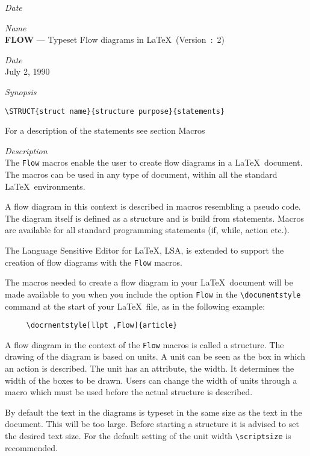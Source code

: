 \begin{namelist}{{\large\it Date}}

\item[{\large\it Name}]\mbox{}\\
    {\bf FLOW} --- Typeset Flow diagrams in \LaTeX\ (Version~:~2)

\item[{\large\it Date}]\mbox{}\\
     July 2, 1990

\item[{\large\it Synopsis}]\mbox{}
\begin{verbatim}
\STRUCT{struct name}{structure purpose}{statements}
\end{verbatim} For a description of the statements see section
Macros

\item[{\large\it Description}]\mbox{}\\
The {\tt Flow} macros
enable the user to create flow diagrams in a \LaTeX\  document.
The macros can be used in any type of document, within all the
standard \LaTeX\  environments.

A flow diagram in this context is
described in macros resembling a pseudo code. The diagram itself
is defined as a structure and is build from statements. Macros
are available for all standard programming statements (if, while,
action etc.).

The Language Sensitive Editor for \LaTeX, LSA, is extended to
support the creation of flow diagrams with the {\tt Flow}
macros.

The macros needed to create a flow diagram in your \LaTeX\  document
will be made available to you when you include the option {\tt Flow}
in the \verb+\documentstyle+ command at the start of
your \LaTeX\  file, as in the following example:
\begin{verbatim}
     \docrnentstyle[llpt ,Flow]{article}
\end{verbatim}
A flow diagram in the context of the {\tt Flow}
macros is called a structure. The drawing of the diagram is based
on units. A unit can be seen as the box in which an action is
described.  The unit has an attribute, the width. It determines
the width of the boxes to be drawn. Users can change the width of
units through a macro which must be used before the actual
structure is described.

By default the text in the diagrams is
typeset in the same size as the text in the document. This will
be too large. Before starting a structure it is advised to set the
desired text size. For the default setting of the unit width
\verb+\scriptsize+ is recommended.


\end{namelist}
